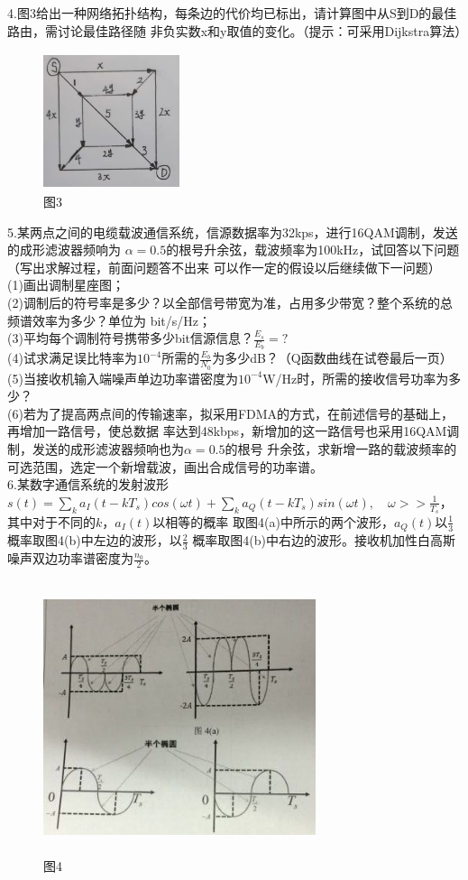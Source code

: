 \documentclass[UTF8]{ctexart}
\begin{document}
4.图3给出一种网络拓扑结构，每条边的代价均已标出，请计算图中从S到D的最佳路由，需讨论最佳路径随
非负实数x和y取值的变化。（提示：可采用Dijkstra算法）
\begin{figure}[H]
  \centering
  \includegraphics[width=4cm,height=4cm]{3_4.jpg}
  \caption*{图3}
\end{figure}
5.某两点之间的电缆载波通信系统，信源数据率为32kps，进行16QAM调制，发送的成形滤波器频响为
$\alpha=0.5$的根号升余弦，载波频率为100kHz，试回答以下问题（写出求解过程，前面问题答不出来
可以作一定的假设以后继续做下一问题）\\
(1)画出调制星座图；\\
(2)调制后的符号率是多少？以全部信号带宽为准，占用多少带宽？整个系统的总频谱效率为多少？单位为
bit/s/Hz；\\
(3)平均每个调制符号携带多少bit信源信息？$\frac{E_s}{E_b}=?$\\
(4)试求满足误比特率为$10^{-4}$所需的$\frac{E_b}{N_0}$为多少dB？（Q函数曲线在试卷最后一页）\\
(5)当接收机输入端噪声单边功率谱密度为$10^{-4}$W/Hz时，所需的接收信号功率为多少？\\
(6)若为了提高两点间的传输速率，拟采用FDMA的方式，在前述信号的基础上，再增加一路信号，使总数据
率达到48kbps，新增加的这一路信号也采用16QAM调制，发送的成形滤波器频响也为$\alpha=0.5$的根号
升余弦，求新增一路的载波频率的可选范围，选定一个新增载波，画出合成信号的功率谱。\\
6.某数字通信系统的发射波形$s(t)=\sum\limits_k a_I(t-kT_s)cos(\omega t)+\sum\limits_k a_Q
  (t-kT_s)sin(\omega t),\quad\omega>>\frac{1}{T_s}$，其中对于不同的$k$，$a_I(t)$以相等的概率
取图4(a)中所示的两个波形，$a_Q(t)$以$\frac{1}{3}$概率取图4(b)中左边的波形，以$\frac{2}{3}$
概率取图4(b)中右边的波形。接收机加性白高斯噪声双边功率谱密度为$\frac{n_0}{2}$。
\begin{figure}[H]
  \centering
  \includegraphics[width=8cm,height=8cm]{3_6.jpeg}
  \caption*{图4}
\end{figure}
\end{document}
